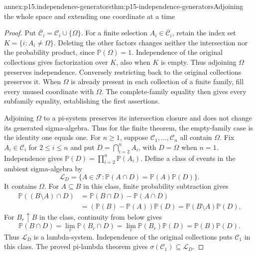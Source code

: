 \begin{annexitem}{annex:p15.independence-generators}{thm:p15-independence-generators}{Adjoining the whole space and extending one coordinate at a time}
\begin{proof}
Put \(\overline{\mathcal C}_i=\mathcal C_i\cup\{\Omega\}\).
For a finite selection \(A_i\in\overline{\mathcal C}_i\), retain
the index set \(K=\{i:A_i\ne\Omega\}\). Deleting the other
factors changes neither the intersection nor the probability product,
since \(\mathbb P(\Omega)=1\). Independence of the original
collections gives factorization over \(K\), also when \(K\)
is empty. Thus adjoining \(\Omega\) preserves independence.
Conversely restricting back to the original collections preserves it.
When \(\Omega\) is already present in each collection of a
finite family, fill every unused coordinate with \(\Omega\).
The complete-family equality then gives every subfamily equality,
establishing the first assertions.

Adjoining \(\Omega\) to a pi-system preserves its intersection
closure and does not change its generated sigma-algebra. Thus for
the finite theorem, the empty-family case is the identity one equals
one. For \(n\geq1\), suppose \(\mathcal C_1,\ldots,\mathcal C_n\)
all contain \(\Omega\). Fix \(A_i\in\mathcal C_i\) for
\(2\leq i\leq n\) and put \(D=\bigcap_{i=2}^n A_i\),
with \(D=\Omega\) when \(n=1\). Independence gives
\(\mathbb P(D)=\prod_{i=2}^n\mathbb P(A_i)\).
Define a class of events in the ambient sigma-algebra by
\[
 \mathcal L_D=\{A\in\mathcal F:
          \mathbb P(A\cap D)=\mathbb P(A)\mathbb P(D)\}.
\]
It contains \(\Omega\). For \(A\subseteq B\) in this class,
finite probability subtraction gives
\[
 \begin{aligned}
 \mathbb P((B\setminus A)\cap D)
   &=\mathbb P(B\cap D)-\mathbb P(A\cap D)\\
   &=(\mathbb P(B)-\mathbb P(A))\mathbb P(D)
     =\mathbb P(B\setminus A)\mathbb P(D).
 \end{aligned}
\]
For \(B_r\uparrow B\) in the class, continuity from below gives
\[
 \mathbb P(B\cap D)=\lim_r\mathbb P(B_r\cap D)
        =\lim_r\mathbb P(B_r)\mathbb P(D)
        =\mathbb P(B)\mathbb P(D).
\]
Thus \(\mathcal L_D\) is a lambda-system. Independence of the
original collections puts \(\mathcal C_1\) in this class.
The proved pi-lambda theorem gives
\(\sigma(\mathcal C_1)\subseteq\mathcal L_D\).


\end{proof}
\end{annexitem}
